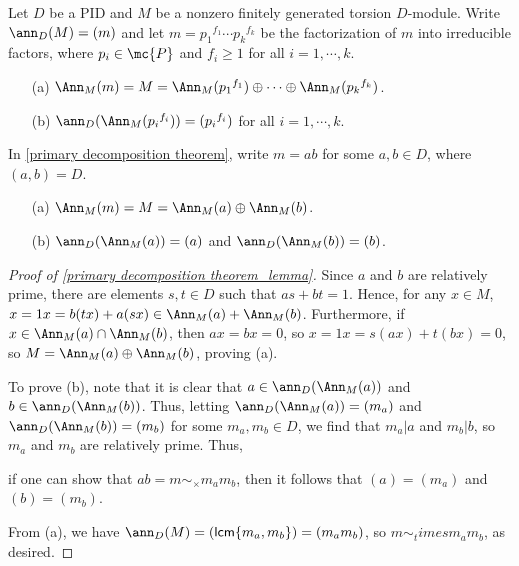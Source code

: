 \begin{thm}\label{primary decomposition theorem}
    Let $D$ be a PID and $M$ be a nonzero finitely generated torsion $D$-module.
    Write $\ann_D(M)=(m)$ and let $m={p_1}^{f_1}\cdots {p_k}^{f_k}$ be the factorization of $m$ into irreducible factors, where $p_i\in\mc{P}$ and $f_i\geq 1$ for all $i=1, \cdots, k$.
    \begin{enumerate}
        \item[(a)]
        {
            $\Ann_M(m)=M=\Ann_M({p_1}^{f_1})\oplus\cdots\oplus\Ann_M({p_k}^{f_k})$.
        }
        \item[(b)]
        {
            $\ann_D(\Ann_M({p_i}^{f_i}))=({p_i}^{f_i})$ for all $i=1, \cdots, k$.
        }
    \end{enumerate}
\end{thm}
\begin{lem}\label{primary decomposition theorem_lemma}
    In \cref{primary decomposition theorem}, write $m=ab$ for some $a, b\in D$, where $(a, b)=D$.
    \begin{enumerate}
        \item[(a)]
        {
            $\Ann_M(m)=M=\Ann_M(a)\oplus\Ann_M(b)$.
        }
        \item[(b)]
        {
            $\ann_D(\Ann_M(a))=(a)$ and $\ann_D(\Ann_M(b))=(b)$.
        }
    \end{enumerate}
\end{lem}
\begin{proof}[Proof of \cref{primary decomposition theorem_lemma}]
    Since $a$ and $b$ are relatively prime, there are elements $s, t\in D$ such that $as+bt=1$.
    Hence, for any $x\in M$, $x=1x=b(tx)+a(sx)\in\Ann_M(a)+\Ann_M(b)$.
    Furthermore, if $x\in\Ann_M(a)\cap\Ann_M(b)$, then $ax=bx=0$, so $x=1x=s(ax)+t(bx)=0$, so $M=\Ann_M(a)\oplus\Ann_M(b)$, proving (a).

    To prove (b), note that it is clear that $a\in\ann_D(\Ann_M(a))$ and $b\in\ann_D(\Ann_M(b))$.
    Thus, letting $\ann_D(\Ann_M(a))=(m_a)$ and $\ann_D(\Ann_M(b))=(m_b)$ for some $m_a, m_b\in D$, we find that $m_a|a$ and $m_b|b$, so $m_a$ and $m_b$ are relatively prime.
    Thus,
    \begin{center}
        if one can show that $ab=m\sim_\times m_a m_b$, then it follows that $(a)=(m_a)$ and $(b)=(m_b)$.
    \end{center}
    From (a), we have $\ann_D(M)=(\textsf{lcm}\{m_a, m_b\})=(m_a m_b)$, so $m\sim_times m_a m_b$, as desired.
\end{proof}
